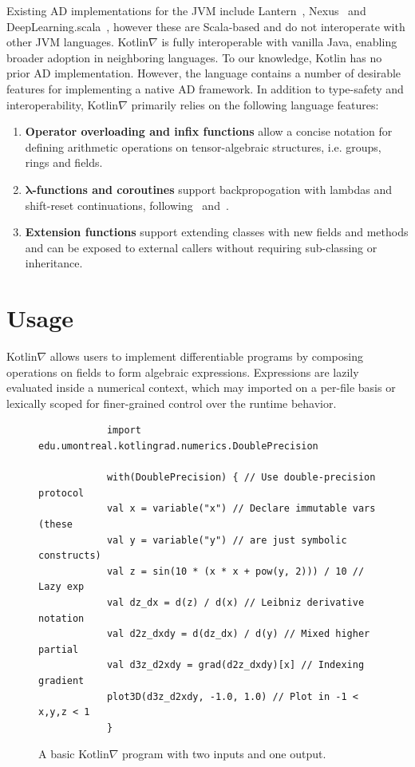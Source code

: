 \documentclass{article}
\newcommand{\squeezeup}{\vspace{-2.5mm}}
\begin{document}
    Existing AD implementations for the JVM include Lantern~\cite{wang2018demystifying}, Nexus~\cite{chen2017typesafe} and DeepLearning.scala~\cite{yang2018dl4s}, however these are Scala-based and do not interoperate with other JVM languages. Kotlin$\nabla$ is fully interoperable with vanilla Java, enabling broader adoption in neighboring languages. To our knowledge, Kotlin has no prior AD implementation. However, the language contains a number of desirable features for implementing a native AD framework. In addition to type-safety and interoperability, Kotlin$\nabla$ primarily relies on the following language features:
    \squeezeup\squeezeup
    \begin{enumerate}[itemsep=-0.5ex]
        \item \textbf{Operator overloading and infix functions} allow a concise notation for defining arithmetic operations on tensor-algebraic structures, i.e. groups, rings and fields.
        \item \textbf{$\mathbf{\lambda}$-functions and coroutines} support backpropogation with lambdas and shift-reset continuations, following~\citealt{pearlmutter2008reverse} and~\citealt{wang2018demystifying}.
        \item \textbf{Extension functions} support extending classes with new fields and methods and can be exposed to external callers without requiring sub-classing or inheritance.
    \end{enumerate}
    \squeezeup\squeezeup
    \section{Usage}

    Kotlin$\nabla$ allows users to implement differentiable programs by composing operations on fields to form algebraic expressions. Expressions are lazily evaluated inside a numerical context, which may imported on a per-file basis or lexically scoped for finer-grained control over the runtime behavior.

    \begin{figure}[!htb]
        \begin{verbatim}
            import edu.umontreal.kotlingrad.numerics.DoublePrecision

            with(DoublePrecision) { // Use double-precision protocol
            val x = variable("x") // Declare immutable vars (these
            val y = variable("y") // are just symbolic constructs)
            val z = sin(10 * (x * x + pow(y, 2))) / 10 // Lazy exp
            val dz_dx = d(z) / d(x) // Leibniz derivative notation
            val d2z_dxdy = d(dz_dx) / d(y) // Mixed higher partial
            val d3z_d2xdy = grad(d2z_dxdy)[x] // Indexing gradient
            plot3D(d3z_d2xdy, -1.0, 1.0) // Plot in -1 < x,y,z < 1
            }
        \end{verbatim}
        \squeezeup\squeezeup
        \caption{A basic Kotlin$\nabla$ program with two inputs and one output.}
        \label{label:fig1}
    \end{figure}
\end{document}
